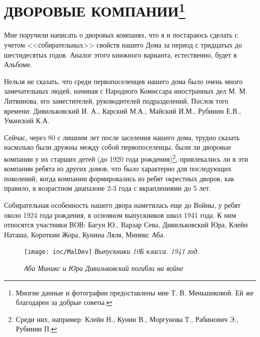 \chapter{ДВОРОВЫЕ КОМПАНИИ\protect\footnote{Многие данные и фотографии предоставлены мне Т. В. Меньшиковой. Ей же благодарен за добрые советы.}}

\noindent
Мне поручили написать о дворовых компанях, что я и постараюсь сделать с учетом <<собирательных>> свойств нашего Дома за период с тридцатых до шестидесятых годов. Аналог этого книжного варианта, естественно, будет в Альбоме.

Нельзя не сказать, что среди первопоселенцев нашего дома было очень много замечательных людей, начиная с Народного Комиссара иностранных дел М. М. Литвинова, его заместителей, руководителей подразделений, Послов того времени: Дивильковский И. А., Карский М.А., Майский И.М., Рубинин Е.В., Уманский К.А.

Сейчас, через 80 с лишним лет после заселения нашего дома, трудно сказать насколько были дружны между собой первопоселенцы, были ли дворовые компании у их старших детей (до 1920 года рождения)\footnote{Среди них, например: Клейн Н., Кунин В., Моргунова Т., Рабинович Э., Рубинин П.}, привлекались ли в эти компании ребята из других домов, что было характерно для последующих поколений, когда компании формировались из ребят окрестных дворов, как правило, в возрастном диапазоне 2-3 года с вкраплениями до 5 лет.

Собирательная особенность нашего двора наметилась еще до Войны, у ребят около 1924 года рождения, в основном выпускников школ 1941 года. К ним относятся участники ВОВ: Багун Ю., Варзар Сева, Дивильковский Юра, Клейн Наташа, Короткин Жора, Кунина Ляля, Миникс Аба.

\restoregeometry


\begin{figure}[h]
    \begin{minipage}{90mm}
        \texttt{[image: inc/MalDev]}
        \textit{\footnotesize{Выпускники 10Б класса. 1941 год.}}
    \end{minipage}
\end{figure}

\vfill

\begin{figure}[h!]
    \begin{minipage}{73mm}
    \begin{minipage}[h!]{34mm}
    \end{minipage}
    \hspace{3mm}
    \begin{minipage}[h!]{34mm}
    \end{minipage}    
    \vspace{-20pt}
    
    \textit{\footnotesize{Аба Миникс и Юра Дивильковский погибли на войне}}
    \end{minipage}
\end{figure}

